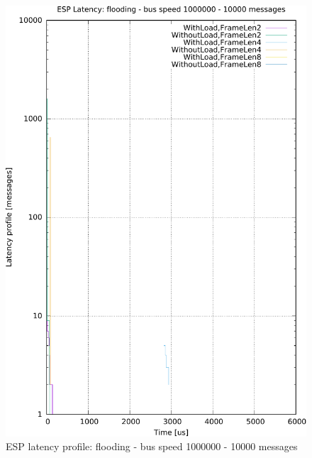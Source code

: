 \documentclass{ctuthesis}
\begin{document}
\begin{figure}[htb]
\includegraphics[width=\linewidth]{figures/speed1000000_messages10000_floodTrue.pdf}
\caption{ESP latency profile: flooding - bus speed 1000000 - 10000 messages}
\end{figure}
\end{document}
